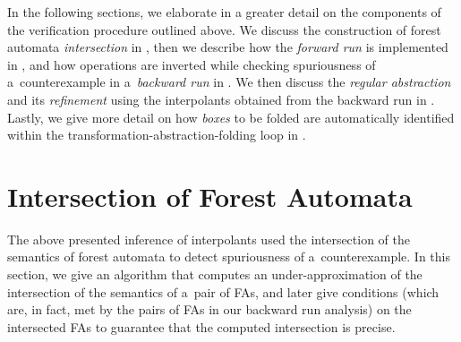 
In the following sections, we elaborate in a greater detail on the components
of the verification procedure outlined above. 
We discuss the construction of forest automata \emph{intersection} in ,  
then we describe how the \emph{forward run} is implemented
in , 
and how operations are
inverted while checking spuriousness of a~counterexample in a~\emph{backward
run} in .
We then discuss the \emph{regular abstraction} and its
\emph{refinement} using the interpolants obtained from the backward run
in .
Lastly, we give more detail on how \emph{boxes} to be folded are automatically identified within the
transformation-abstraction-folding loop in .

\section{Intersection of Forest Automata}
\label{sec:intersection}

The above presented inference of interpolants used the intersection of the semantics of forest automata to
detect spuriousness of a~counterexample.
In this section, we give an algorithm that computes an under-approximation of
the intersection of the semantics of a~pair of FAs, and later give conditions
(which are, in fact, met by the pairs of FAs in our backward run analysis) on
the intersected FAs to guarantee that the computed intersection is precise.

